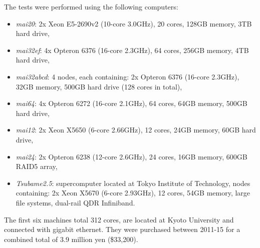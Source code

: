 \documentclass[a4paper,11pt]{article}   \usepackage{authblk} \usepackage[top=1.9cm,bottom=1.9cm,left=1.9cm,right=1.9cm]{geometry}
\newcommand{\compname}{\emph}
\newcommand{\mai}{\compname{mai12}\xspace}
\newcommand{\mait}{\compname{mai20}\xspace}
\newcommand{\mais}{\compname{mai64}\xspace}
\newcommand{\mainew}{\compname{mai32abcd}\xspace}
\newcommand{\maitf}{\compname{mai24}\xspace}
\newcommand{\maief}{\compname{mai32ef}\xspace}
\newcommand{\tsubame}{\compname{Tsubame2.5}\xspace}
\begin{document}
The tests were performed using the following computers:
\begin{itemize}
\item
\mait: 2x Xeon E5-2690v2 (10-core 3.0GHz), 20 cores, 128GB memory, 3TB hard drive,
\item
\maief: 4x Opteron 6376 (16-core 2.3GHz), 64 cores, 256GB memory, 4TB hard drive,
\item
\mainew: 4 nodes, each containing: 2x Opteron 6376 (16-core 2.3GHz), 32GB memory, 500GB hard drive (128 cores in total),
\item
\mais: 4x Opteron 6272 (16-core 2.1GHz), 64 cores, 64GB memory, 500GB hard drive,
\item
\mai: 2x Xeon X5650 (6-core 2.66GHz), 12 cores, 24GB memory, 60GB hard drive,
\item
\maitf: 2x Opteron 6238 (12-core 2.6GHz), 24 cores, 16GB memory, 600GB RAID5 array,
\item
\tsubame: supercomputer located at Tokyo Institute of Technology, nodes containing: 2x Xeon X5670 (6-core 2.93GHz), 12 cores, 54GB memory, large file systems, dual-rail QDR Infiniband.
\end{itemize}
The first six machines total 312 cores, are located at Kyoto University and connected with gigabit ethernet. They were purchased between 2011-15 for a combined
total of 3.9 million yen (\$33,200).
\end{document}
